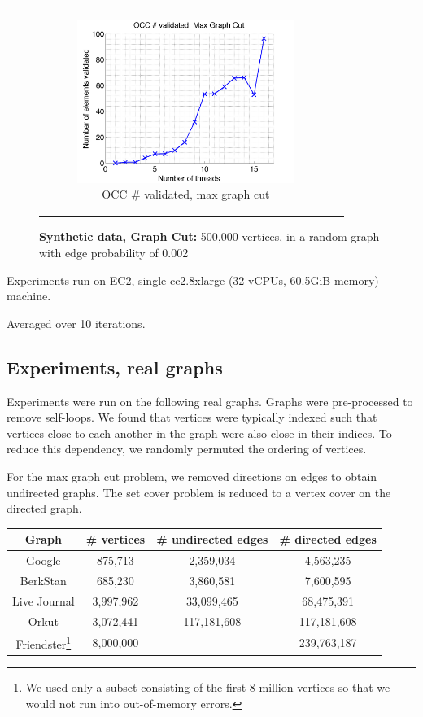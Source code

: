 \documentclass{article} %
\begin{document}
\begin{figure}[ht]
\begin{tabular}{cc}
	  \begin{subfigure}[b]{0.5\textwidth}
	  	\includegraphics[width=200pt]{images/validated_OCC_maxgraphcut_500000_2.png}
			\caption{OCC \# validated, max graph cut}
			\label{fig:occsvalidated_maxgraphcut}
	  \end{subfigure} \\
	\end{tabular}
	\caption{\textbf{Synthetic data, Graph Cut:} 500,000 vertices, in a random graph with edge probability of 0.002}
\end{figure}

Experiments run on EC2, single cc2.8xlarge (32 vCPUs, 60.5GiB memory) machine.

Averaged over 10 iterations.




\subsection{Experiments, real graphs}
Experiments were run on the following real graphs.
Graphs were pre-processed to remove self-loops.
We found that vertices were typically indexed such that vertices close to each another in the graph were also close in their indices.
To reduce this dependency, we randomly permuted the ordering of vertices.

For the max graph cut problem, we removed directions on edges to obtain undirected graphs.
The set cover problem is reduced to a vertex cover on the directed graph.

\begin{table}[h]
\centering
\begin{tabular}{|c|c|c|c|}\hline
Graph & \# vertices & \# undirected edges & \# directed edges\\\hline\hline
Google & 875,713 & 2,359,034 & 4,563,235\\\hline
BerkStan & 685,230 & 3,860,581 & 7,600,595\\\hline
Live Journal & 3,997,962 & 33,099,465 & 68,475,391\\\hline
Orkut & 3,072,441 & 117,181,608 & 117,181,608\\\hline
Friendster\footnote{We used only a subset consisting of the first 8 million vertices so that we would not run into out-of-memory errors.} & 8,000,000 &  & 239,763,187\\\hline
\end{tabular}
\end{table}
\end{document}
